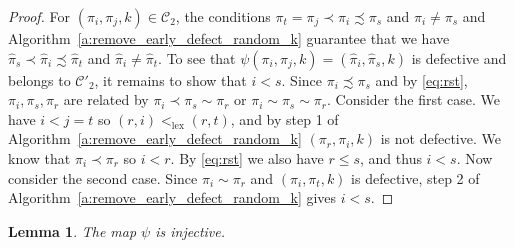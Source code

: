 \documentclass[12pt]{amsart}
\newtheorem{lem}[thm]{Lemma}
\theoremstyle{definition}
\numberwithin{equation}{section}
\newcommand{\C}{\mathcal{C}}
\newcommand{\D}{\mathcal{D}}
\begin{document}
\begin{proof}
    
 For $(\pi_i, \pi_j, k) \in \C_2$, the conditions
 $\pi_t=\pi_j\prec \pi_i\precsim \pi_s$ and $\pi_i\neq \pi_s$ 
and 
Algorithm~\ref{a:remove_early_defect_random_k} 
guarantee that
 we have $\hat\pi_s\prec \hat\pi_i \precsim \hat\pi_t$ and $\hat\pi_i \neq \hat\pi_t$. 
 To see that $\psi(\pi_i, \pi_j, k) = (\hat\pi_i, \hat\pi_s,k)$ is defective and belongs to $\C'_2$,
it remains to show that $i<s$.
Since $\pi_i \precsim \pi_s$ and by \eqref{eq:rst}, $\pi_i, \pi_s, \pi_r$ are related by $\pi_i \prec \pi_s \sim \pi_r$ or $\pi_i \sim \pi_s \sim \pi_r$.
Consider the first case. We have $i < j = t$ so $(r, i) <_{\mathrm{lex}} (r, t)$, and by step 1 of Algorithm~\ref{a:remove_early_defect_random_k} $(\pi_r, \pi_i, k)$ is not defective. We know that $\pi_i \prec \pi_r$ so $i < r$. By \eqref{eq:rst} we also have $r \leq s$, and thus $i < s$.
Now consider the second case. Since $\pi_i \sim \pi_r$ and $(\pi_i, \pi_t,k)$ is defective, step 2 of Algorithm~\ref{a:remove_early_defect_random_k} gives $i < s$.
\end{proof}

\begin{lem}\label{lem: injective}
The map $\psi$ is injective. 
\end{lem}
\end{document}
